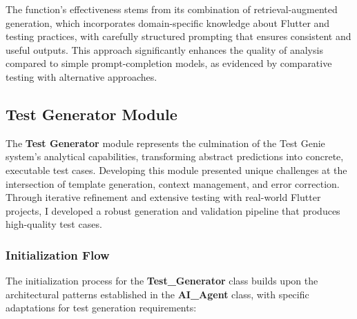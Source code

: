 The function's effectiveness stems from its combination of retrieval-augmented generation, which incorporates domain-specific knowledge about Flutter and testing practices, with carefully structured prompting that ensures consistent and useful outputs. This approach significantly enhances the quality of analysis compared to simple prompt-completion models, as evidenced by comparative testing with alternative approaches.

\subsection{Test Generator Module}

The \textbf{Test Generator} module represents the culmination of the Test Genie system's analytical capabilities, transforming abstract predictions into concrete, executable test cases. Developing this module presented unique challenges at the intersection of template generation, context management, and error correction. Through iterative refinement and extensive testing with real-world Flutter projects, I developed a robust generation and validation pipeline that produces high-quality test cases.

\subsubsection{Initialization Flow}

The initialization process for the \textbf{Test\_Generator} class builds upon the architectural patterns established in the \textbf{AI\_Agent} class, with specific adaptations for test generation requirements:

